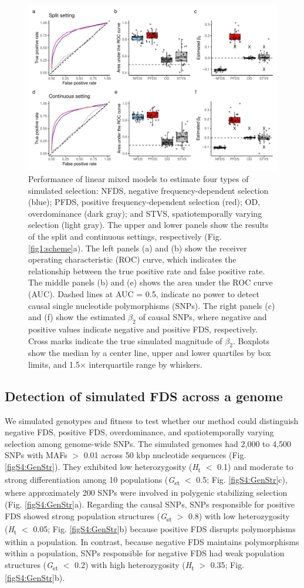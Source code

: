 \documentclass[12pt,]{article}
\begin{document}
\begin{figure}[ht]
  \includegraphics[width=0.7\linewidth]{beta2LMMdomi.pdf}
  \caption{Performance of linear mixed models to estimate four types of simulated selection: NFDS, negative frequency-dependent selection (blue); PFDS, positive frequency-dependent selection (red); OD, overdominance (dark gray); and STVS, spatiotemporally varying selection (light gray). The upper and lower panels show the results of the split and continuous settings, respectively (Fig. \ref{fig1:scheme}a). The left panels (a) and (b) show the receiver operating characteristic (ROC) curve, which indicates the relationship between the true positive rate and false positive rate. The middle panels (b) and (e) shows the area under the ROC curve (AUC). Dashed lines at AUC = 0.5, indicate no power to detect causal single nucleotide polymorphisms (SNPs). The right panels (c) and (f) show the estimated $\beta_2$ of causal SNPs, where negative and positive values indicate negative and positive FDS, respectively. Cross marks indicate the true simulated magnitude of $\beta_2$. Boxplots show the median by a center line, upper and lower quartiles by box limits, and 1.5$\times$ interquartile range by whiskers.}
  \label{fig4:beta2LMM}
\end{figure}

\subsection{Detection of simulated FDS across a genome}
We simulated genotypes and fitness to test whether our method could distinguish negative FDS, positive FDS, overdominance, and spatiotemporally varying selection among genome-wide SNPs. The simulated genomes had 2,000 to 4,500 SNPs with MAFs $>$ 0.01 across 50 kbp nucleotide sequences (Fig. \ref{figS4:GenStr}). They exhibited low heterozygosity (\textit{H}\textsubscript{t} $<$ 0.1) and moderate to strong differentiation among 10 populations (\textit{G}\textsubscript{st} $<$ 0.5; Fig. \ref{figS4:GenStr}c), where approximately 200 SNPs were involved in polygenic stabilizing selection (Fig. \ref{figS4:GenStr}a). Regarding the causal SNPs, SNPs responsible for positive FDS showed strong population structures (\textit{G}\textsubscript{st} $>$ 0.8) with low heterozygosity (\textit{H}\textsubscript{t} $<$ 0.05; Fig. \ref{figS4:GenStr}b) because positive FDS disrupts polymorphisms within a population. In contrast, because negative FDS maintains polymorphisms within a population, SNPs responsible for negative FDS had weak population structures (\textit{G}\textsubscript{st} $<$ 0.2) with high heterozygosity (\textit{H}\textsubscript{t} $>$ 0.35; Fig. \ref{figS4:GenStr}b).
\end{document}
